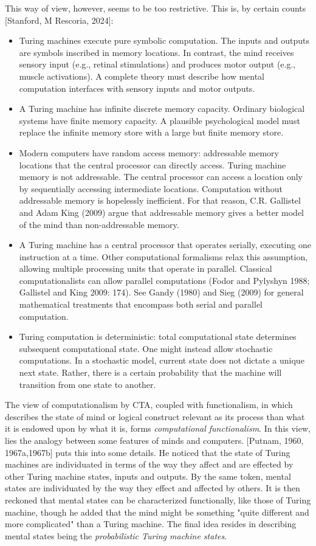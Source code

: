 This way of view, however, seems to be too restrictive. This is, by certain counts [Stanford, M Rescoria, 2024]: 
\begin{itemize}
    \item Turing machines execute pure symbolic computation. The inputs and outputs are symbols inscribed in memory locations. In contrast, the mind receives sensory input (e.g., retinal stimulations) and produces motor output (e.g., muscle activations). A complete theory must describe how mental computation interfaces with sensory inputs and motor outputs.
    \item A Turing machine has infinite discrete memory capacity. Ordinary biological systems have finite memory capacity. A plausible psychological model must replace the infinite memory store with a large but finite memory store.
    \item Modern computers have random access memory: addressable memory locations that the central processor can directly access. Turing machine memory is not addressable. The central processor can access a location only by sequentially accessing intermediate locations. Computation without addressable memory is hopelessly inefficient. For that reason, C.R. Gallistel and Adam King (2009) argue that addressable memory gives a better model of the mind than non-addressable memory.
    \item A Turing machine has a central processor that operates serially, executing one instruction at a time. Other computational formalisms relax this assumption, allowing multiple processing units that operate in parallel. Classical computationalists can allow parallel computations (Fodor and Pylyshyn 1988; Gallistel and King 2009: 174). See Gandy (1980) and Sieg (2009) for general mathematical treatments that encompass both serial and parallel computation.
    \item Turing computation is deterministic: total computational state determines subsequent computational state. One might instead allow stochastic computations. In a stochastic model, current state does not dictate a unique next state. Rather, there is a certain probability that the machine will transition from one state to another.
\end{itemize}

The view of computationalism by CTA, coupled with functionalism, in which describes the state of mind or logical construct relevant as its process than what it is endowed upon by what it is, forms \textit{computational functionalism}. In this view, lies the analogy between some features of minds and computers. [Putnam, 1960, 1967a,1967b] puts this into some details. He noticed that the state of Turing machines are individuated in terms of the way they affect and are effected by other Turing machine states, inputs and outputs. By the same token, mental states are individuated by the way they effect and affected by others. It is then reckoned that mental states can be characterized functionally, like those of Turing machine, though he added that the mind might be something "quite different and more complicated" than a Turing machine. The final idea resides in describing mental states being the \textit{probabilistic Turing machine states}. 

